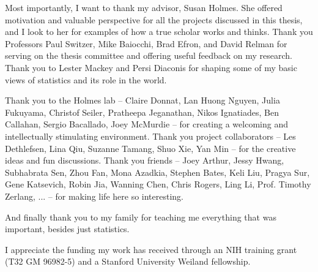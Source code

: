 
Most importantly, I want to thank my advisor, Susan Holmes. She offered
motivation and valuable perspective for all the projects discussed in this
thesis, and I look to her for examples of how a true scholar works and thinks.
Thank you Professors Paul Switzer, Mike Baiocchi, Brad Efron, and David Relman
for serving on the thesis committee and offering useful feedback on my research.
Thank you to Lester Mackey and Persi Diaconis for shaping some of my basic views
of statistics and its role in the world.

Thank you to the Holmes lab -- Claire Donnat, Lan Huong Nguyen, Julia Fukuyama,
Christof Seiler, Pratheepa Jeganathan, Nikos Ignatiades, Ben Callahan, Sergio
Bacallado, Joey McMurdie -- for creating a welcoming and intellectually
stimulating environment. Thank you project collaborators -- Les Dethlefsen, Lina
Qiu, Suzanne Tamang, Shuo Xie, Yan Min -- for the creative ideas and fun
discussions. Thank you friends -- Joey Arthur, Jessy Hwang, Subhabrata Sen, Zhou
Fan, Mona Azadkia, Stephen Bates, Keli Liu, Pragya Sur, Gene Katsevich, Robin
Jia, Wanning Chen, Chris Rogers, Ling Li, Prof. Timothy Zerlang, ... -- for
making life here so interesting.

And finally thank you to my family for teaching me everything that was
important, besides just statistics.

I appreciate the funding my work has received through an NIH training grant (T32
GM 96982-5) and a Stanford University Weiland fellowship.
